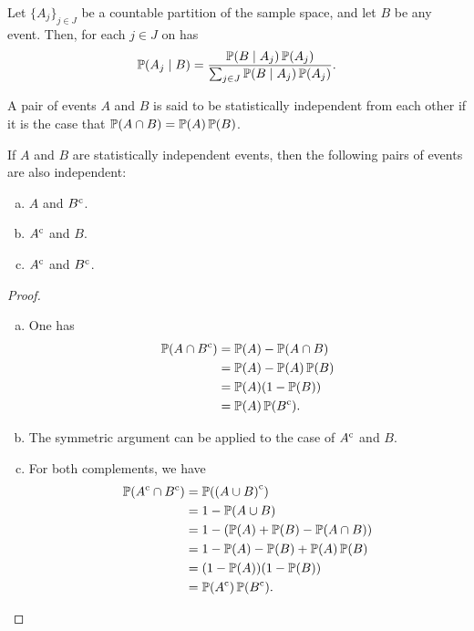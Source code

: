 \begin{theorem}
\label{thm:bayes-rule}
Let \(\{A_{j}\}_{j \in J}\) be a countable partition of the sample space, and
let \(B\) be any event. Then, for each \(j \in J\) on has
\[
\operatorname{\mathbb{P}}(A_j \mid B) =
\frac{\operatorname{\mathbb{P}}(B \mid A_j) \operatorname{\mathbb{P}}(A_j)}{\sum_{j \in J} \operatorname{\mathbb{P}}(B \mid A_j) \operatorname{\mathbb{P}}(A_j)}.
\]
\end{theorem}

\begin{definition}
\label{def:statistically-independent}
A pair of events \(A\) and \(B\) is said to be statistically independent from
each other if it is the case that \(\operatorname{\mathbb{P}}(A \cap B) = \operatorname{\mathbb{P}}(A) \operatorname{\mathbb{P}}(B)\).
\end{definition}

\begin{theorem}
\label{thm:statistically-independent-pairs}
If \(A\) and \(B\) are statistically independent events, then the following
pairs of events are also independent:
\begin{enumerate}[(a)]\setlength\itemsep{0em}
\item \(A\) and \({B}^{\text{c}}\).
\item \({A}^{\text{c}}\) and \(B\).
\item \({A}^{\text{c}}\) and \({B}^{\text{c}}\).
\end{enumerate}
\end{theorem}

\begin{proof}
\begin{enumerate}[(a)]\setlength\itemsep{0em}
\item One has
  \begin{align*}
    \operatorname{\mathbb{P}}(A \cap {B}^{\text{c}})
    &= \operatorname{\mathbb{P}}(A) - \operatorname{\mathbb{P}}(A \cap B) \\
    &= \operatorname{\mathbb{P}}(A) - \operatorname{\mathbb{P}}(A) \operatorname{\mathbb{P}}(B) \\
    &= \operatorname{\mathbb{P}}(A) (1 - \operatorname{\mathbb{P}}(B)) \\
    &= \operatorname{\mathbb{P}}(A) \operatorname{\mathbb{P}}({B}^{\text{c}}).
  \end{align*}
\item The symmetric argument can be applied to the case of \({A}^{\text{c}}\) and \(B\).

\item For both complements, we have
  \begin{align*}
    \operatorname{\mathbb{P}}({A}^{\text{c}} \cap {B}^{\text{c}})
    &= \operatorname{\mathbb{P}}({(A \cup B)}^{\text{c}}) \\
    &= 1 - \operatorname{\mathbb{P}}(A \cup B) \\
    &= 1 - (\operatorname{\mathbb{P}}(A) + \operatorname{\mathbb{P}}(B) - \operatorname{\mathbb{P}}(A \cap B)) \\
    &= 1 - \operatorname{\mathbb{P}}(A) - \operatorname{\mathbb{P}}(B) + \operatorname{\mathbb{P}}(A) \operatorname{\mathbb{P}}(B) \\
    &= (1 - \operatorname{\mathbb{P}}(A)) (1 - \operatorname{\mathbb{P}}(B)) \\
    &= \operatorname{\mathbb{P}}({A}^{\text{c}}) \operatorname{\mathbb{P}}({B}^{\text{c}}).
  \end{align*}
\end{enumerate}
\end{proof}

